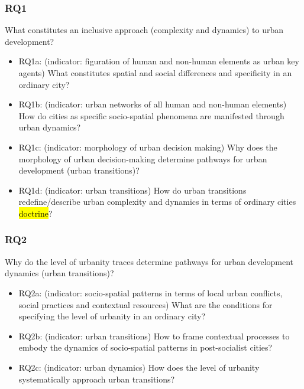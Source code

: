 \documentclass[11pt]{report}
\begin{document}
\subsubsection{RQ1}
What constitutes an inclusive approach (complexity and dynamics) to urban development?
\begin{itemize}
\item RQ1a: (indicator: figuration of human and non-human elements as urban key agents) What constitutes spatial and social differences and specificity in an ordinary city? 
\item RQ1b: (indicator: urban networks of all human and non-human elements) How do cities as specific socio-spatial phenomena are manifested through urban dynamics?
\item RQ1c: (indicator: morphology of urban decision making) Why does the morphology of urban decision-making determine pathways for urban development (urban transitions)?
\item RQ1d: (indicator: urban transitions) How do urban transitions redefine/describe urban complexity and dynamics in terms of ordinary cities \hl{doctrine}?
\end {itemize}

\subsubsection{RQ2}
Why do the level of urbanity traces determine pathways for urban development dynamics (urban transitions)? 
\begin{itemize}
\item RQ2a: (indicator: socio-spatial patterns in terms of local urban conflicts, social practices and contextual resources) What are the conditions for specifying the level of urbanity in an ordinary city?
\item RQ2b: (indicator:  urban transitions) How to frame contextual processes to embody the dynamics of socio-spatial patterns in post-socialist cities?
\item RQ2c: (indicator: urban dynamics) How does the level of urbanity systematically approach urban transitions?
\end {itemize}
\end{document}

